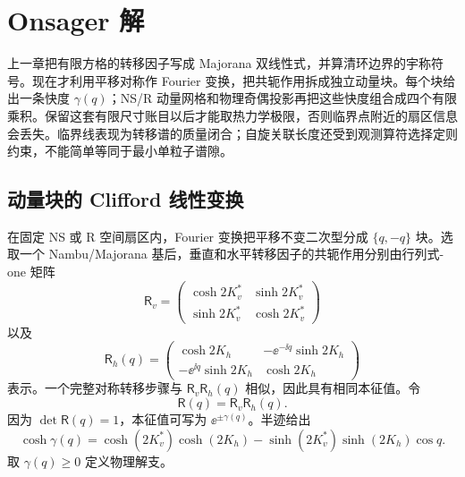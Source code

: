 \section{Onsager 解}
\label{chap:phys-sm-onsager-exact-solution}

上一章把有限方格的转移因子写成 Majorana 双线性式，并算清环边界的宇称符号。现在才利用平移对称作 Fourier 变换，把共轭作用拆成独立动量块。每个块给出一条快度 \(\gamma(q)\)；NS/R 动量网格和物理奇偶投影再把这些快度组合成四个有限乘积。保留这套有限尺寸账目以后才能取热力学极限，否则临界点附近的扇区信息会丢失。临界线表现为转移谱的质量闭合；自旋关联长度还受到观测算符选择定则约束，不能简单等同于最小单粒子谱隙。
\subsection{动量块的 Clifford 线性变换}
\label{sec:phys-sm-onsager-solution}

在固定 NS 或 R 空间扇区内，Fourier 变换把平移不变二次型分成 \(\{q,-q\}\) 块。选取一个 Nambu/Majorana 基后，垂直和水平转移因子的共轭作用分别由行列式-one 矩阵
\begin{equation}
 \mathsf R_v=
 \begin{pmatrix}
 \cosh 2K_v^*&\sinh 2K_v^*\\
 \sinh 2K_v^*&\cosh 2K_v^*
 \end{pmatrix}
 \label{eq:phys-sm-rv-block}
\end{equation}
以及
\begin{equation}
 \mathsf R_h(q)=
 \begin{pmatrix}
 \cosh 2K_h&-\ee^{-\ii q}\sinh 2K_h\\
 -\ee^{\ii q}\sinh 2K_h&\cosh 2K_h
 \end{pmatrix}
 \label{eq:phys-sm-rh-block}
\end{equation}
表示。一个完整对称转移步骤与 \(\mathsf R_v\mathsf R_h(q)\) 相似，因此具有相同本征值。令
\[
 \mathsf R(q)=\mathsf R_v\mathsf R_h(q).
\]
因为 \(\det\mathsf R(q)=1\)，本征值可写为 \(\ee^{\pm\gamma(q)}\)。半迹给出
\begin{equation}
 \cosh\gamma(q)
 =\cosh(2K_v^*)\cosh(2K_h)
 -\sinh(2K_v^*)\sinh(2K_h)\cos q.
 \label{eq:phys-sm-gamma-dispersion}
\end{equation}
取 \(\gamma(q)\ge0\) 定义物理解支。

